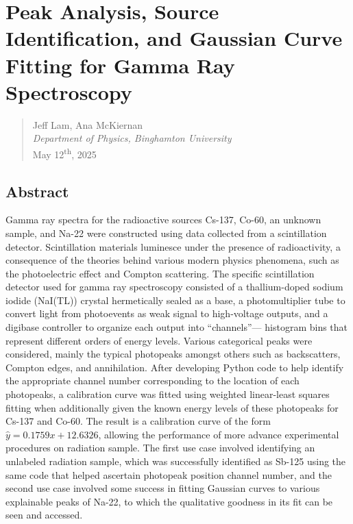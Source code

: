 \documentclass[12pt]{article}
\begin{document}

\section*{Peak Analysis, Source Identification, and Gaussian Curve Fitting for Gamma Ray Spectroscopy}

\begin{quote}
    Jeff Lam, Ana McKiernan \\
    \textit{Department of Physics, Binghamton University} \\
    May 12\textsuperscript{th}, 2025
\end{quote}

\subsection*{Abstract}
Gamma ray spectra for the radioactive sources Cs-137, Co-60, an unknown sample,
and Na-22 were constructed using data collected from a scintillation detector.
Scintillation materials luminesce under the presence of radioactivity, a consequence
of the theories behind various modern physics phenomena, such as the photoelectric
effect and Compton scattering. The specific scintillation detector used for gamma ray
spectroscopy consisted of a thallium-doped sodium iodide (NaI(TL)) crystal hermetically sealed as a 
base, a photomultiplier tube to convert light from photoevents as weak signal to high-voltage outputs, and a 
digibase controller to organize each output into ``channels''--- histogram bins that represent different orders of 
energy levels. Various categorical peaks were considered, mainly the typical photopeaks amongst others
such as backscatters, Compton edges, and annihilation. After developing Python code to help
identify the appropriate channel number corresponding to the location of each photopeaks,
a calibration curve was fitted using weighted linear-least squares fitting when
additionally given the known energy levels of these photopeaks for Cs-137 and Co-60.
The result is a calibration curve of the form $\hat{y}=0.1759x+12.6326$, allowing the performance
of more advance experimental procedures on radiation sample. The first use case involved
identifying an unlabeled radiation sample, which was successfully identified as Sb-125
using the same code that helped ascertain photopeak position channel number, and the second use case
involved some success in fitting Gaussian curves to various explainable peaks of Na-22,
to which the qualitative goodness in its fit can be seen and accessed.
\end{document}
